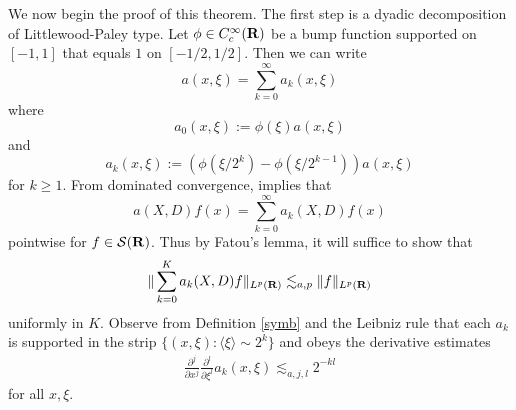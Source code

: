\documentclass[11pt]{article}
\theoremstyle{definition}
\begin{document}
We now begin the proof of this theorem. The first step is a dyadic decomposition of Littlewood-Paley type. Let \({\phi \in C^\infty_c({\bf R})}\) be a bump function supported on \({[-1,1]}\) that equals \({1}\) on \({[-1/2,1/2]}\). Then we can write 
\[\displaystyle  a(x,\xi) = \sum_{k=0}^\infty a_k(x,\xi)\]
 where 
\[\displaystyle  a_0(x,\xi) := \phi(\xi) a(x,\xi) \]
 and 
\[\displaystyle  a_k(x,\xi) := (\phi(\xi/2^k) - \phi(\xi/2^{k-1})) a(x,\xi)\]
 for \({k \geq 1}\). From dominated convergence, implies that 
\[\displaystyle  a(X,D) f(x) = \sum_{k=0}^\infty a_k(X,D) f(x)\]
 pointwise for \({f \in {\mathcal S}({\bf R})}\). Thus by Fatou’s lemma, it will suffice to show that 
\[\displaystyle  \| \sum_{k=0}^K a_k(X,D) f \|_{L^p({\bf R})} \lesssim_{a,p} \|f\|_{L^p({\bf R})}\]
 uniformly in \({K}\). Observe from Definition \ref{symb} and the Leibniz rule that each \({a_k}\) is supported in the strip \({\{ (x,\xi): \langle \xi \rangle \sim 2^k \}}\) and obeys the derivative estimates 
\begin{align}\label{akderiv}
  \frac{\partial^j}{\partial x^j} \frac{\partial^l}{\partial \xi^l} a_k(x,\xi) \lesssim_{a,j,l} 2^{-kl} 
\end{align}
 for all \({x,\xi}\).
\end{document}

